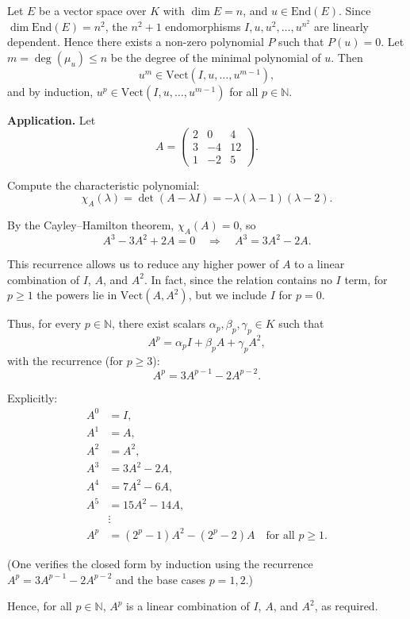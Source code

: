 \documentclass[12pt]{article}
\begin{document}
\begin{correctionbox}
Let $ E $ be a vector space over $ K $ with $ \dim E = n $, and $ u \in \mathrm{End}(E) $.  
Since $ \dim \mathrm{End}(E) = n^2 $, the $ n^2 + 1 $ endomorphisms $ I, u, u^2, \dots, u^{n^2} $ are linearly dependent. Hence there exists a non-zero polynomial $ P $ such that $ P(u) = 0 $. Let $ m = \deg(\mu_u) \leq n $ be the degree of the minimal polynomial of $ u $. Then
\[
u^m \in \mathrm{Vect}(I, u, \dots, u^{m-1}),
\]
and by induction, $ u^p \in \mathrm{Vect}(I, u, \dots, u^{m-1}) $ for all $ p \in \mathbb{N} $.

\medskip

\noindent\textbf{Application.} Let 
\[
A = \begin{pmatrix}
2 & 0 & 4 \\
3 & -4 & 12 \\
1 & -2 & 5
\end{pmatrix}.
\]

Compute the characteristic polynomial:
\[
\chi_A(\lambda) = \det(A - \lambda I) = -\lambda(\lambda - 1)(\lambda - 2).
\]

By the Cayley–Hamilton theorem, $ \chi_A(A) = 0 $, so
\[
A^3 - 3A^2 + 2A = 0 \quad \Longrightarrow \quad A^3 = 3A^2 - 2A.
\]

This recurrence allows us to reduce any higher power of $ A $ to a linear combination of $ I $, $ A $, and $ A^2 $. In fact, since the relation contains no $ I $ term, for $ p \geq 1 $ the powers lie in $ \mathrm{Vect}(A, A^2) $, but we include $ I $ for $ p = 0 $.

Thus, for every $ p \in \mathbb{N} $, there exist scalars $ \alpha_p, \beta_p, \gamma_p \in K $ such that
\[
A^p = \alpha_p I + \beta_p A + \gamma_p A^2,
\]
with the recurrence (for $ p \geq 3 $):
\[
A^p = 3A^{p-1} - 2A^{p-2}.
\]

Explicitly:
\[
\boxed{
\begin{aligned}
A^0 &= I, \\
A^1 &= A, \\
A^2 &= A^2, \\
A^3 &= 3A^2 - 2A, \\
A^4 &= 7A^2 - 6A, \\
A^5 &= 15A^2 - 14A, \\
&\vdots \\
A^p &= (2^p - 1)A^2 - (2^p - 2)A \quad \text{for all } p \geq 1.
\end{aligned}
}
\]

(One verifies the closed form by induction using the recurrence $ A^p = 3A^{p-1} - 2A^{p-2} $ and the base cases $ p=1,2 $.)

Hence, for all $ p \in \mathbb{N} $, $ A^p $ is a linear combination of $ I $, $ A $, and $ A^2 $, as required.
\end{correctionbox}
\end{document}
